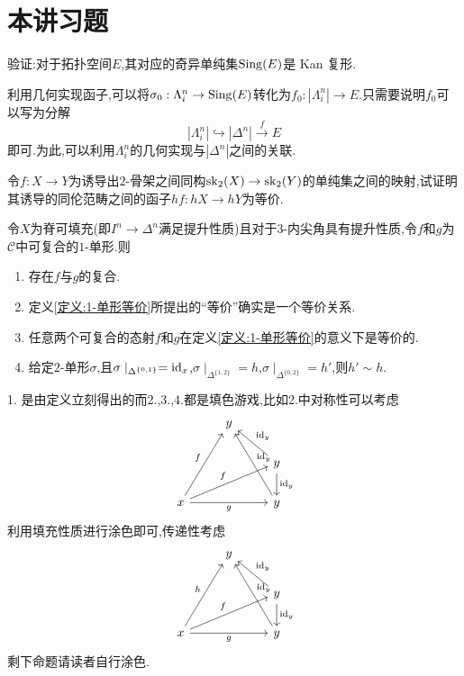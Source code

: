 \section{本讲习题}
\begin{exercise}
    验证:对于拓扑空间$E$,其对应的奇异单纯集$\operatorname{Sing}(E)$是 Kan 复形.
\end{exercise}
\begin{solution}
    利用几何实现函子,可以将$\sigma_0:\Lambda_i^n \to \operatorname{Sing}(E)$转化为$f_0:|\Lambda_i^n| \to E$.只需要说明$f_0$可以写为分解
    \[
        |\Lambda_i^n| \hookrightarrow |\Delta^n|\xrightarrow{f} E
    \]
    即可.为此,可以利用$\Lambda_i^n$的几何实现与$|\Delta^n|$之间的关联.
\end{solution}
\begin{exercise}[骨架与同构]
    令$f: X \to Y$为诱导出$2$-骨架之间同构$\operatorname{sk}_2(X) \to \operatorname{sk}_2(Y)$的单纯集之间的映射,试证明其诱导的同伦范畴之间的函子$hf : hX\to hY$为等价.
\end{exercise}
\begin{exercise}[填色游戏]
    令$X$为脊可填充(即$I^n \to \Delta^n$满足提升性质)且对于$3$-内尖角具有提升性质,令$f$和$g$为$\mathcal{C}$中可复合的$1$-单形.则
    \begin{enumerate}
        \item 存在$f$与$g$的复合.
        \item 定义\ref{定义:1-单形等价}所提出的``等价''确实是一个等价关系.
        \item 任意两个可复合的态射$f$和$g$在定义\ref{定义:1-单形等价}的意义下是等价的.
        \item 给定$2$-单形$\sigma$,且$\sigma\mid_{\Delta^{\{0,1\}}}=\mathrm{id}_x$,$\sigma\mid_{\Delta^{\{1,2\}}}=h$,$\sigma\mid_{\Delta^{\{0,2\}}}=h'$,则$h' \sim h$.
    \end{enumerate}
\end{exercise}
\begin{solution}
    1. 是由定义立刻得出的而2.,3.,4.都是填色游戏,比如2.中对称性可以考虑
    \[\begin{tikzcd}
	& y \\
	&& y \\
	x && y
	\arrow["{\identity_y}"', from=2-3, to=1-2]
	\arrow["{\identity_y}", from=2-3, to=3-3]
	\arrow["f", from=3-1, to=1-2]
	\arrow["f", from=3-1, to=2-3]
	\arrow["g"', from=3-1, to=3-3]
	\arrow["{\identity_y}"', from=3-3, to=1-2]
    \end{tikzcd}\]
    利用填充性质进行涂色即可,传递性考虑
    \[\begin{tikzcd}
	& y \\
	&& y \\
	x && y
	\arrow["{\identity_y}"', from=2-3, to=1-2]
	\arrow["{\identity_y}", from=2-3, to=3-3]
	\arrow["h", from=3-1, to=1-2]
	\arrow["f", from=3-1, to=2-3]
	\arrow["g"', from=3-1, to=3-3]
	\arrow["{\identity_y}"', from=3-3, to=1-2]
    \end{tikzcd}\]
    剩下命题请读者自行涂色.
\end{solution}
